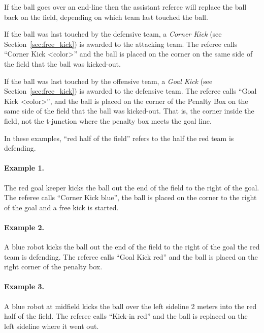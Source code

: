 \documentclass[12pt]{article}
\newcommand{\cf}{see\xspace}
\begin{document}
If the ball goes over an end-line then the assistant referee will replace the ball back on the field, depending on which team last touched the ball.

If the ball was last touched by the defensive team, a \emph{Corner Kick} (\cf Section~\ref{sec:free_kick}) is awarded to the attacking team. The referee calls ``Corner Kick \textless color\textgreater'' and the ball is placed on the corner on the same side of the field that the ball was kicked-out.

If the ball was last touched by the offensive team, a \emph{Goal Kick} (\cf Section~\ref{sec:free_kick}) is awarded to the defensive team. The referee calls ``Goal Kick \textless color\textgreater'', and the ball is placed on the corner of the Penalty Box on the same side of the field that the ball was kicked-out. That is, the corner inside the field, not the t-junction where the penalty box meets the goal line.


In these examples, ``red half of the field'' refers to the half the red team is defending.

\paragraph{Example 1.} The red goal keeper kicks the ball out the end of the field to the right of the goal. The referee calls ``Corner Kick blue'', the ball is placed on the corner to the right of the goal and a free kick is started.

\paragraph{Example 2.} A blue robot kicks the ball out the end of the field to the right of the goal the red team is defending. The referee calls ``Goal Kick red'' and the ball is placed on the right corner of the penalty box.

\paragraph{Example 3.} A blue robot at midfield kicks the ball over the left sideline 2 meters into the red half of the field. The referee calls ``Kick-in red'' and the ball is replaced on the left sideline where it went out.
\end{document}
